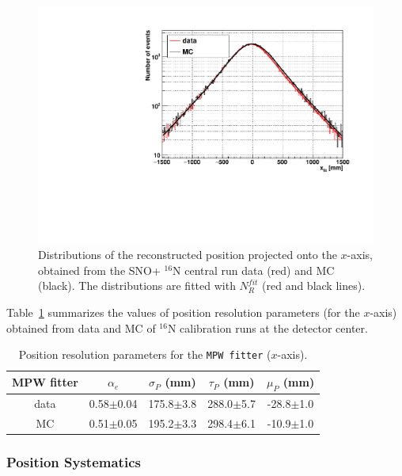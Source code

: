 \begin{figure}
	\centering
	\includegraphics[width=140mm]{posResol.pdf}
	\caption[Distributions of the reconstructed position projected onto the $x$-axis.]{Distributions of the reconstructed position projected onto the $x$-axis, obtained from the SNO+ {$^{16}$}N central run data (red) and MC (black). The distributions are fitted with $N_R^{fit}$ (red and black lines).	\label{fig:posresol}}
\end{figure}

Table~\ref{tab:posresol} summarizes the values of position resolution parameters (for the $x$-axis) obtained from data and MC of {$^{16}$}N calibration runs at the detector center.
\vspace{1mm}
\begin{table}[ht]
	\centering
	\caption{Position resolution parameters for the \texttt{MPW fitter} ($x$-axis).}
	\label{tab:posresol}
	\begin{tabular}{ccccc}
		\toprule
		MPW fitter & $\alpha_e$ & $\sigma_P$ (mm) & $\tau_P$ (mm)& $\mu_P$ (mm)\\
		\hline 
		data& 0.58$\pm$0.04 & 175.8$\pm$3.8 & 288.0$\pm$5.7 & -28.8$\pm$1.0\\
		\hline 
		MC & 0.51$\pm$0.05 & 195.2$\pm$3.3 & 298.4$\pm$6.1 & -10.9$\pm$1.0\\
		\bottomrule
	\end{tabular}
\end{table}
\vspace{1mm}

\subsubsection{Position Systematics}

